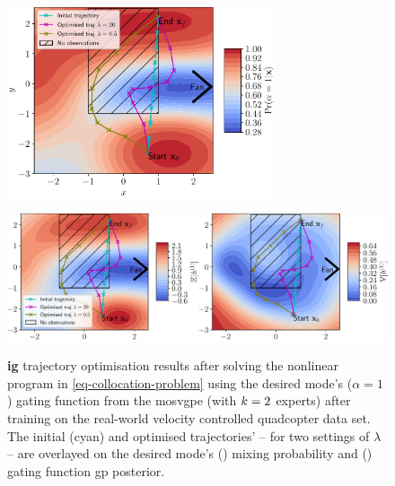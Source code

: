 \documentclass{mimosis-class/mimosis}
\numberwithin{equation}{chapter}
\newcommand{\modeInd}{\ensuremath{k}}
\newcommand{\ModeInd}{\ensuremath{\MakeUppercase{\modeInd}}}
\newcommand{\modeVar}{\ensuremath{\alpha}}
\begin{document}
{\begin{figure}[!t]
\centering
\begin{minipage}[r]{\columnwidth}
\centering
\includegraphics[width=0.7\textwidth]{./images/geometric-traj-opt-over-prob.pdf}
\label{fig-geometric-traj-opt-over-prob}
\end{minipage}
\begin{minipage}[r]{\columnwidth}
\centering
\includegraphics[width=\textwidth]{./images/geometric-traj-opt-over-svgp.pdf}
\label{fig-geometric-traj-opt-over-svgp}
\end{minipage}
\caption[\acrfull{ig} trajectory optimisation results in real-world quadcopter experiments over gating network posterior]{\textbf{\acrfull{ig}} trajectory optimisation results after solving the nonlinear
program in \cref{eq-collocation-problem}
using the desired mode's ($\modeVar=1$) gating function from the \acrshort{mosvgpe} (with $\ModeInd=2$ experts)
after training on the real-world velocity controlled quadcopter data set.
The initial (cyan) and optimised trajectories' -- for two settings of $\lambda$ -- are
overlayed on the desired mode's () mixing probability and
() gating function \acrshort{gp} posterior.}
\label{fig-geometric-traj-opt}
\end{figure}

}
\end{document}
